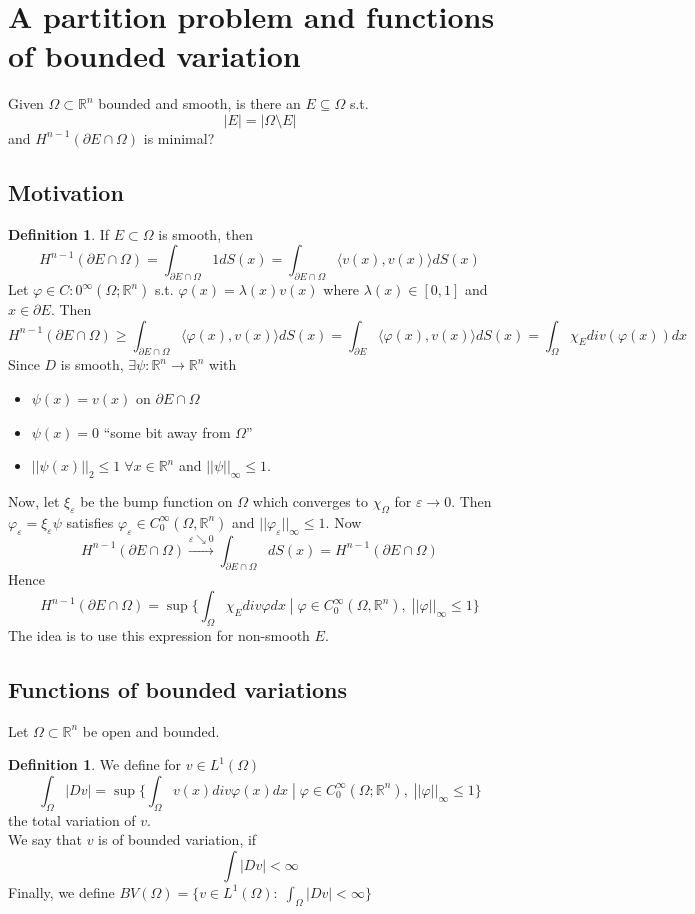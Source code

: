 \documentclass[a4paper, 12pt]{article}
\theoremstyle{plain}
\theoremstyle{definition}
\newtheorem{definition}[theorem]{Definition} %
\theoremstyle{lemma}
\theoremstyle{remark}
\theoremstyle{corollary}
\theoremstyle{example}
\begin{document}
\section{A partition problem and functions of bounded variation}
	Given $\Omega \subset \mathbb{R}^n$ bounded and smooth, is there an $E \subseteq \Omega$ s.t. \[\left|E\right| = \left|\Omega \setminus E\right|\]
	and $H^{n-1}(\partial E\cap \Omega)$ is minimal?
	\subsection{Motivation}
	\begin{definition}
		If $E \subset \Omega$ is smooth, then \[H^{n-1}(\partial E \cap \Omega) = \int_{\partial E \cap \Omega} 1 dS(x) = \int_{\partial E \cap \Omega} \langle v(x), v(x) \rangle dS(x)\]
		Let $\varphi \in C:0^\infty(\Omega; \mathbb{R}^n)$ s.t. $\varphi(x) = \lambda(x)v(x)$ where $\lambda(x) \in [0,1]$ and $x \in \partial E$. Then $$H^{n-1}(\partial E \cap \Omega) \geq \int_{\partial E \cap \Omega} \langle \varphi(x), v(x)\rangle dS(x) = \int_{\partial E} \langle \varphi(x), v(x)\rangle dS(x) = \int_\Omega \chi_E div(\varphi(x))dx$$
		Since $D$ is smooth, $\exists \psi: \mathbb{R}^n \to \mathbb{R}^n$ with \begin{itemize}
			\item $\psi(x) = v(x)$ on $\partial E \cap \Omega$
			\item $\psi(x) = 0$ ``some bit away from $\Omega$''
			\item $||\psi(x)||_2 \leq 1 \; \forall x \in \mathbb{R}^n$ and $||\psi||_\infty \leq 1$.
		\end{itemize}
		Now, let $\xi_\varepsilon$ be the bump function on $\Omega$ which converges to $\chi_\Omega$ for $\varepsilon \to 0$. Then $\varphi_\varepsilon = \xi_\varepsilon \psi$ satisfies $\varphi_\varepsilon \in C_0^\infty(\Omega, \mathbb{R}^n)$ and $||\varphi_\varepsilon||_\infty \leq 1$. Now \[H^{n-1}(\partial E \cap \Omega) \overset{\varepsilon \searrow 0}{\to} \int_{\partial E \cap \Omega} dS(x) = H^{n-1}(\partial E \cap \Omega)\]
		Hence \[H^{n-1}(\partial E \cap \Omega) = \sup\{\int_\Omega \chi_E div \varphi dx \; | \; \varphi \in C_0^\infty(\Omega, \mathbb{R}^n), \; ||\varphi||_\infty \leq 1\}\]
		The idea is to use this expression for non-smooth $E$.
	\end{definition}
	\subsection{Functions of bounded variations}
	Let $\Omega \subset \mathbb{R}^n$ be open and bounded. 
	\begin{definition}
		We define for $v \in L^1(\Omega)$
		$$\int_\Omega \left|Dv\right| = \sup\{\int_\Omega v(x) div \varphi(x) dx \; | \; \varphi \in C_0^\infty(\Omega; \mathbb{R}^n), \; ||\varphi||_\infty \leq 1\}$$ the total variation of $v$.\\
		We say that $v$ is of bounded variation, if \[\int \left|Dv\right| < \infty\]
		Finally, we define $BV(\Omega) = \{v \in L^1(\Omega): \; \int_\Omega \left|Dv\right| < \infty\}$
	\end{definition}
\end{document}
